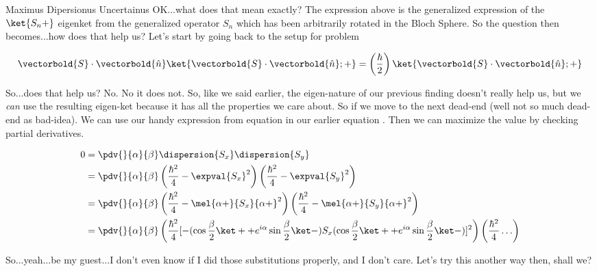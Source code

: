 \begin{answer}
\begin{answerpart}{Maximus Dipersionus Uncertainus}
    OK...what does that mean exactly?  The expression above is the
    generalized expression of the $\ket{S_n+}$ eigenket from the
    generalized operator $S_n$ which has been arbitrarily rotated in
    the Bloch Sphere.  So the question then becomes...how does that
    help us?  Let's start by going back to the setup for problem

    \begin{equation}
      \vectorbold{S}\cdot\vectorbold{\hat{n}} \ket{\vectorbold{S}\cdot\vectorbold{\hat{n}}; +}
      = \left(\frac{\hbar}{2}\right)\ket{\vectorbold{S}\cdot\vectorbold{\hat{n}}; +}
    \end{equation}

    So...does that help us?  No.  No it does not.  So, like we said
    earlier, the eigen-nature of our previous finding doesn't really
    help us, but we \emph{can} use the resulting eigen-ket because it
    has all the properties we care about.  So if we move to the next
    dead-end (well not so much dead-end as bad-idea).  We can use our
    handy expression from equation  in our earlier
    equation .  Then we can maximize the value by checking
    partial derivatives.

    \begin{equation}
      \begin{split}
        0
        &= \pdv{}{\alpha}{\beta} \dispersion{S_x}\dispersion{S_y}\\
        &= \pdv{}{\alpha}{\beta}
        \left(\frac{\hbar^2}{4} - \expval{S_x}^2\right)
        \left(\frac{\hbar^2}{4} - \expval{S_y}^2\right)
        \\
        &= \pdv{}{\alpha}{\beta}
        \left(\frac{\hbar^2}{4} - \mel{\alpha+}{S_x}{\alpha+}^2\right)
        \left(\frac{\hbar^2}{4} - \mel{\alpha+}{S_y}{\alpha+}^2\right)
        \\
        &= \pdv{}{\alpha}{\beta}
        \left(\frac{\hbar^2}{4}
        [- (\cos{\frac{\beta}{2}} \ket + + e^{i\alpha}\sin{\frac{\beta}{2}} \ket -)
        S_x
        (\cos{\frac{\beta}{2}} \ket + + e^{i\alpha}\sin{\frac{\beta}{2}} \ket -)]^2\right)
        \left(\frac{\hbar^2}{4}
        \ldots
        \right)
        \\
      \end{split}
    \end{equation}

    So...yeah...be my guest...I don't even know if I did those
    substitutions properly, and I don't care.  Let's try this another
    way then, shall we?


\end{answerpart}
\end{answer}
